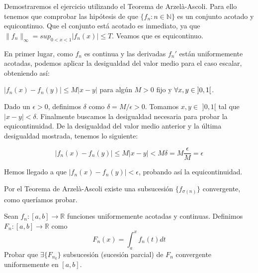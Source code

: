 \begin{sol}
  Demostraremos el ejercicio utilizando el Teorema de
  Arzelà-Ascoli. Para ello tenemos que comprobar las hipótesis de que
  $\{f_n : n \in \mathbb{N}\}$ es un conjunto acotado y
  equicontinuo. Que el conjunto está acotado es inmediato, ya que
  $\|f_n\|_\infty = sup_{0<x<1}|f_n(x)| \leq T$. Veamos que es
  equicontinuo.

	En primer lugar, como $f_n$ es continua y las derivadas $f_n'$ están uniformemente acotadas, podemos aplicar la desigualdad del valor medio para el caso escalar, obteniendo así:

	$|f_n(x) - f_n(y)| \leq M|x-y|$ para algún $M > 0$ fijo y
        $\forall x,y \in \hspace{1mm} ]0,1[$.

	Dado un $\epsilon > 0$, definimos $\delta$ como
        $\delta = M / \epsilon > 0$. Tomamos $x,y \in$ $]0,1[$ tal que
        $|x-y|<\delta$. Finalmente buscamos la desigualdad necesaria
        para probar la equicontinuidad. De la desigualdad del valor
        medio anterior y la última desigualdad mostrada, tenemos lo
        siguiente:

	$$|f_n(x) - f_n(y)| \leq M|x-y| < M\delta = M \frac{\epsilon}{M} = \epsilon$$ 

	Hemos llegado a que $|f_n(x) - f_n(y)| < \epsilon$, probando
        así la equicontinuidad.

	Por el Teorema de Arzelà-Ascoli existe una subsucesión $\{f_{\sigma(n)}\}$ convergente, como queríamos probar.


  \end{sol}
  
\newpage  
\begin{ejer}
	Sean $f_n:[a,b]\rightarrow\mathbb{R}$ funciones uniformemente acotadas y continuas. Definimos $F_n:[a,b]\rightarrow\mathbb{R}$ como $$F_n(x) = \int_{a}^{x} f_n(t) dt$$
	Probar que $\exists \{F_{n_k}\}$ subsucesión (sucesión parcial) de $F_n$ convergente uniformemente en $[a,b]$.
	
\end{ejer}

